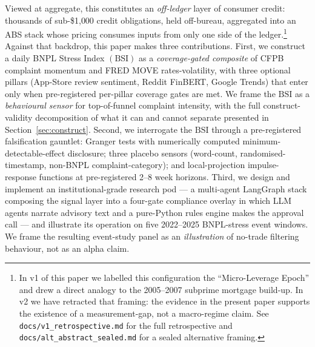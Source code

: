 \documentclass[11pt,letterpaper]{article}
\newcommand{\bsi}{\text{BSI}}
\begin{document}
Viewed at aggregate, this constitutes an \emph{off-ledger}
layer of consumer credit: thousands of sub-\$1{,}000 credit
obligations, held off-bureau, aggregated into an ABS stack
whose pricing consumes inputs from only one side of the
ledger.\footnote{In v1 of this paper we labelled this
configuration the ``Micro-Leverage Epoch'' and drew a direct
analogy to the 2005--2007 subprime mortgage build-up. In v2 we
have retracted that framing: the evidence in the present paper
supports the existence of a measurement-gap, not a macro-regime
claim. See \texttt{docs/v1\_retrospective.md} for the full
retrospective and \texttt{docs/alt\_abstract\_sealed.md} for a
sealed alternative framing.} Against that backdrop, this paper
makes three contributions.
First, we construct a daily BNPL Stress Index $(\bsi)$ as a
\emph{coverage-gated composite} of CFPB complaint momentum
and FRED MOVE rates-volatility, with three optional pillars
(App-Store review sentiment, Reddit FinBERT, Google Trends)
that enter only when pre-registered per-pillar coverage
gates are met. We frame the $\bsi$ as a \emph{behavioural
sensor} for top-of-funnel complaint intensity, with the
full construct-validity decomposition of what it can and
cannot separate presented in Section~\ref{sec:construct}.
Second, we interrogate the $\bsi$ through a pre-registered
falsification gauntlet: Granger tests with numerically
computed minimum-detectable-effect disclosure; three placebo
sensors (word-count, randomised-timestamp, non-BNPL
complaint-category); and local-projection impulse-response
functions at pre-registered 2--8 week horizons. Third, we
design and implement an institutional-grade research pod --- a
multi-agent LangGraph stack composing the signal layer into
a four-gate compliance overlay in which LLM agents narrate
advisory text and a pure-Python rules engine makes the
approval call --- and illustrate its operation on five
2022--2025 BNPL-stress event windows. We frame the resulting
event-study panel as an \emph{illustration} of no-trade
filtering behaviour, not as an alpha claim.
\end{document}

